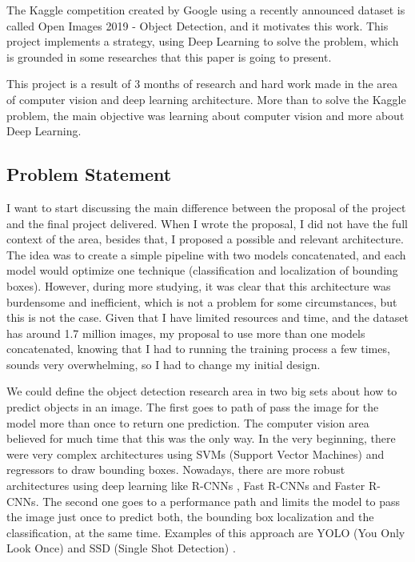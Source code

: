 \documentclass[11pt, a4paper, twocolumn]{article}
\begin{document}
The Kaggle competition created by Google \cite{kaggle} using a recently announced dataset is called Open Images 2019 - Object Detection\cite{google:1}, and it motivates this work. This project implements a strategy, using Deep Learning to solve the problem, which is grounded in some researches that this paper is going to present.

This project is a result of 3 months of research and hard work made in the area of computer vision and deep learning architecture. More than to solve the Kaggle problem, the main objective was learning about computer vision and more about Deep Learning.

\subsection{Problem Statement}

I want to start discussing the main difference between the proposal of the project and the final project delivered. When I wrote the proposal, I did not have the full context of the area, besides that, I proposed a possible and relevant architecture. The idea was to create a simple pipeline with two models concatenated, and each model would optimize one technique (classification and localization of bounding boxes). However, during more studying, it was clear that this architecture was burdensome and inefficient, which is not a problem for some circumstances, but this is not the case. Given that I have limited resources and time, and the dataset has around 1.7 million images, my proposal to use more than one models concatenated, knowing that I had to running the training process a few times, sounds very overwhelming, so I had to change my initial design.

We could define the object detection research area in two big sets about how to predict objects in an image. The first goes to path of pass the image for the model more than once to return one prediction. The computer vision area believed for much time that this was the only way. In the very beginning, there were very complex architectures using SVMs (Support Vector Machines) and regressors \cite{svm1}\cite{svm2} to draw bounding boxes. Nowadays, there are more robust architectures using deep learning like R-CNNs \cite{rcnn}, Fast R-CNNs \cite{fastrcnn} and Faster R-CNNs\cite{fasterrcnn}. The second one goes to a performance path and limits the model to pass the image just once to predict both, the bounding box localization and the classification, at the same time. Examples of this approach are YOLO (You Only Look Once)\cite{yolo} and SSD (Single Shot Detection) \cite{ssd}.
\end{document}
